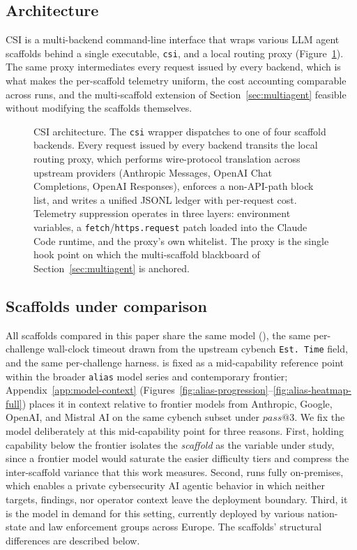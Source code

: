 \subsection{Architecture}\label{sec:architecture}

CSI is a multi-backend command-line interface that wraps various LLM agent scaffolds behind a single executable, \texttt{csi}, and a local routing proxy (Figure~\ref{fig:arch}). The same proxy intermediates every request issued by every backend, which is what makes the per-scaffold telemetry uniform, the cost accounting comparable across runs, and the multi-scaffold extension of Section~\ref{sec:multiagent} feasible without modifying the scaffolds themselves.

\begin{figure}[t]
\centering

\caption{CSI architecture. The \texttt{csi} wrapper dispatches to one of four scaffold backends. Every request issued by every backend transits the local routing proxy, which performs wire-protocol translation across upstream providers (Anthropic Messages, OpenAI Chat Completions, OpenAI Responses), enforces a non-API-path block list, and writes a unified JSONL ledger with per-request cost. Telemetry suppression operates in three layers: environment variables, a \texttt{fetch}/\texttt{https.request} patch loaded into the Claude Code runtime, and the proxy's own whitelist. The proxy is the single hook point on which the multi-scaffold blackboard of Section~\ref{sec:multiagent} is anchored.}
\label{fig:arch}
\end{figure}

\subsection{Scaffolds under comparison}\label{sec:scaffolds}

All scaffolds compared in this paper share the same model (\aliasmini{}), the same per-challenge wall-clock timeout drawn from the upstream cybench \texttt{Est.~Time} field, and the same per-challenge harness. \aliasmini{} is fixed as a mid-capability reference point within the broader \texttt{alias} model series and contemporary frontier; Appendix~\ref{app:model-context} (Figures~\ref{fig:alias-progression}--\ref{fig:alias-heatmap-full}) places it in context relative to frontier models from Anthropic, Google, OpenAI, and Mistral AI on the same cybench subset under $pass@3$. We fix the model deliberately at this mid-capability point for three reasons. First, holding capability below the frontier isolates the \emph{scaffold} as the variable under study, since a frontier model would saturate the easier difficulty tiers and compress the inter-scaffold variance that this work measures. Second, \aliasmini{} runs fully on-premises, which enables a private cybersecurity AI agentic behavior in which neither targets, findings, nor operator context leave the deployment boundary. Third, it is the model in demand for this setting, currently deployed by various nation-state and law enforcement groups across Europe. The scaffolds' structural differences are described below.

